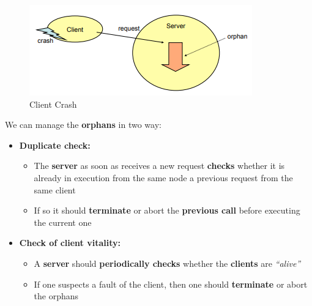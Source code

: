 \begin{figure}[!h]
    \centering
    \includegraphics[width=.7\linewidth]{images/requestReplayCommunication/orphan.png}
    \caption{Client Crash}
\end{figure}
\newpage

We can manage the \textbf{orphans} in two way:
\begin{itemize}
    \item \textbf{Duplicate check:}
        \begin{itemize}
            \item The \textbf{server} as soon as receives a new request \textbf{checks} whether it is already in execution from the same node a previous request from the same client
            \item If so it should \textbf{terminate} or abort the \textbf{previous call} before executing the current one
        \end{itemize}
    \item \textbf{Check of client vitality:}
        \begin{itemize}
            \item A \textbf{server} should \textbf{periodically checks} whether the \textbf{clients} are \textit{“alive”}
            \item If one suspects a fault of the client, then one should \textbf{terminate} or abort the orphans
        \end{itemize}
\end{itemize}